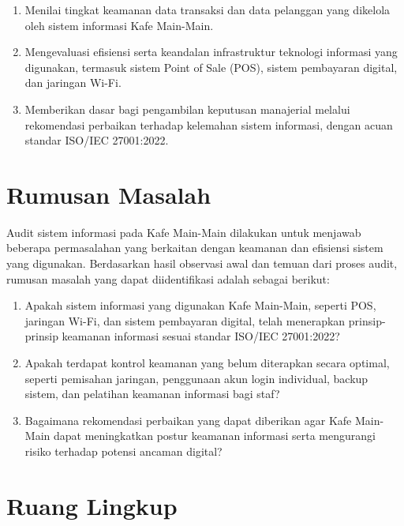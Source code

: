 \documentclass[12pt, a4paper]{report}
\begin{document}
\begin{enumerate}
    \item Menilai tingkat keamanan data transaksi dan data pelanggan yang dikelola oleh sistem informasi Kafe Main-Main.
    
    \item Mengevaluasi efisiensi serta keandalan infrastruktur teknologi informasi yang digunakan, termasuk sistem Point of Sale (POS), sistem pembayaran digital, dan jaringan Wi-Fi.
    
    \item Memberikan dasar bagi pengambilan keputusan manajerial melalui rekomendasi perbaikan terhadap kelemahan sistem informasi, dengan acuan standar ISO/IEC 27001:2022.
\end{enumerate}


\section{Rumusan Masalah}

Audit sistem informasi pada Kafe Main-Main dilakukan untuk menjawab beberapa permasalahan yang berkaitan dengan keamanan dan efisiensi sistem yang digunakan. Berdasarkan hasil observasi awal dan temuan dari proses audit, rumusan masalah yang dapat diidentifikasi adalah sebagai berikut:

\begin{enumerate}
    \item Apakah sistem informasi yang digunakan Kafe Main-Main, seperti POS, jaringan Wi-Fi, dan sistem pembayaran digital, telah menerapkan prinsip-prinsip keamanan informasi sesuai standar ISO/IEC 27001:2022?
    
    \item Apakah terdapat kontrol keamanan yang belum diterapkan secara optimal, seperti pemisahan jaringan, penggunaan akun login individual, backup sistem, dan pelatihan keamanan informasi bagi staf?
    
    \item Bagaimana rekomendasi perbaikan yang dapat diberikan agar Kafe Main-Main dapat meningkatkan postur keamanan informasi serta mengurangi risiko terhadap potensi ancaman digital?
\end{enumerate}



\section{Ruang Lingkup}
\end{document}
